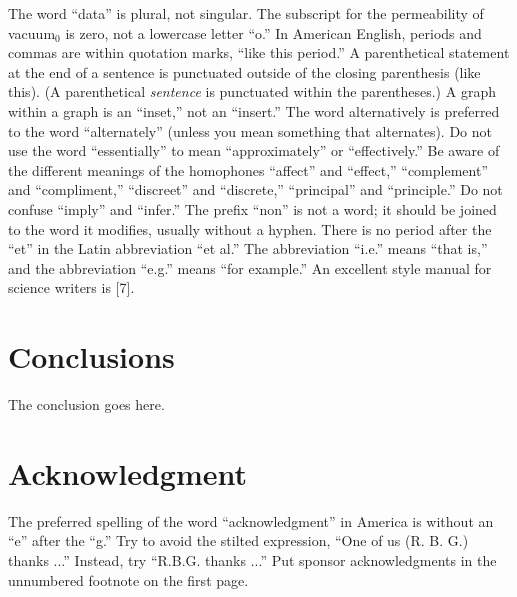 \documentclass[conference,a4paper]{APSIPA2018}
\begin{document}
The word ``data'' is plural, not singular.  The subscript for the
permeability of vacuum$_0$ is zero, not a lowercase letter ``o.''  In
American English, periods and commas are within quotation marks,
``like this period.''  A parenthetical statement at the end of a
sentence is punctuated outside of the closing parenthesis (like this).
(A parenthetical \emph{sentence} is punctuated within the
parentheses.)  A graph within a graph is an ``inset,'' not an
``insert.''  The word alternatively is preferred to the word
``alternately'' (unless you mean something that alternates).  Do not
use the word ``essentially'' to mean ``approximately'' or
``effectively.''  Be aware of the different meanings of the homophones
``affect'' and ``effect,'' ``complement'' and ``compliment,''
``discreet'' and ``discrete,'' ``principal'' and ``principle.''  Do
not confuse ``imply'' and ``infer.''  The prefix ``non'' is not a
word; it should be joined to the word it modifies, usually without a
hyphen.  There is no period after the ``et'' in the Latin abbreviation
``et al.''  The abbreviation ``i.e.''  means ``that is,'' and the
abbreviation ``e.g.''  means ``for example.''  An excellent style
manual for science writers is [7].


\section{Conclusions}
The conclusion goes here.

\section*{Acknowledgment}

The preferred spelling of the word ``acknowledgment'' in America is
without an ``e'' after the ``g.''  Try to avoid the stilted
expression, ``One of us (R. B. G.) thanks ...'' Instead, try
``R.B.G. thanks ...''  Put sponsor acknowledgments in the unnumbered
footnote on the first page.
\end{document}
